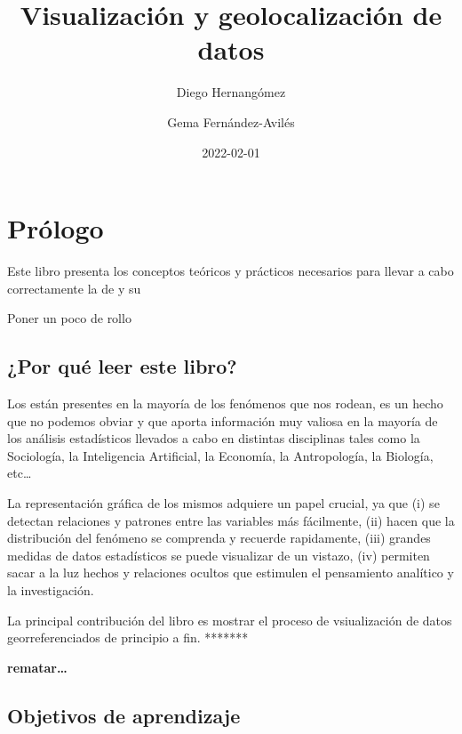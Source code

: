 \documentclass[
]{report}
\title{Visualización y geolocalización de datos}
\author{Diego Hernangómez \and Gema Fernández-Avilés}
\date{2022-02-01}
\theoremstyle{definition}
\theoremstyle{definition}
\theoremstyle{definition}
\theoremstyle{definition}
\theoremstyle{remark}
\begin{document}
\maketitle

{
\setcounter{tocdepth}{1}
\tableofcontents
}
\hypertarget{pruxf3logo}{%
\chapter*{Prólogo}\label{pruxf3logo}}

Este libro presenta los conceptos teóricos y prácticos necesarios
para llevar a cabo correctamente la  de
 y su 

Poner un poco de rollo

\hypertarget{por-quuxe9-leer-este-libro}{%
\section*{¿Por qué leer este libro?}\label{por-quuxe9-leer-este-libro}}

Los  están presentes en la mayoría de los fenómenos que
nos rodean, es un hecho que no podemos obviar y que aporta información muy
valiosa en la mayoría de los análisis estadísticos llevados a cabo en distintas
disciplinas tales como la Sociología, la Inteligencia Artificial, la Economía,
la Antropología, la Biología, etc\ldots{}

La representación gráfica de los
mismos adquiere un papel crucial, ya que (i) se detectan relaciones y
patrones entre las variables más fácilmente, (ii) hacen que la distribución del fenómeno
se comprenda y recuerde rapidamente, (iii) grandes medidas de datos
estadísticos se puede visualizar de un vistazo, (iv) permiten sacar a la luz
hechos y relaciones ocultos que estimulen el pensamiento analítico y la investigación.

La principal contribución del libro es mostrar el proceso de vsiualización
de datos georreferenciados de principio a fin. *******

{\textbf{rematar\ldots{}}}

\hypertarget{objetivos-de-aprendizaje}{%
\section*{Objetivos de aprendizaje}\label{objetivos-de-aprendizaje}}
\end{document}
